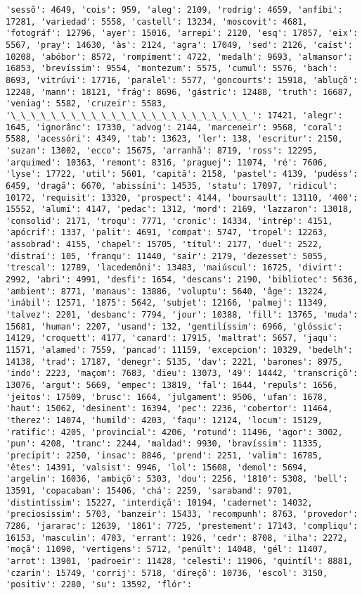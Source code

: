 \begin{Verbatim}[commandchars=\\\{\}]
'sessõ': 4649, 'cois': 959, 'aleg': 2109, 'rodrig': 4659, 'anfíbi': 17281, 'variedad': 5558, 'castell': 13234, 'moscovit': 4681, 'fotográf': 12796, 'ayer': 15016, 'arrepi': 2120, 'esq': 17857, 'eix': 5567, 'pray': 14630, 'às': 2124, 'agra': 17049, 'sed': 2126, 'caíst': 10208, 'abóbor': 8572, 'rompiment': 4722, 'medalh': 9693, 'almansor': 16853, 'brevíssim': 9554, 'montezum': 5575, 'cumul': 5576, 'bach': 8693, 'vitrúvi': 17716, 'paralel': 5577, 'goncourts': 15918, 'abluçõ': 12248, 'mann': 18121, 'frág': 8696, 'gástric': 12488, 'truth': 16687, 'veniag': 5582, 'cruzeir': 5583, '\_\_\_\_\_\_\_\_\_\_\_\_\_\_\_\_\_\_\_\_\_\_\_\_': 17421, 'alegr': 1645, 'ignorânc': 17330, 'advog': 2144, 'marceneir': 9568, 'coral': 5588, 'acessóri': 4349, 'tab': 13623, 'ler': 138, 'escritur': 2150, 'suzan': 13002, 'ecco': 15675, 'arranhã': 8719, 'ross': 12295, 'arquimed': 10363, 'remont': 8316, 'praguej': 11074, 'ré': 7606, 'lyse': 17722, 'util': 5601, 'capitã': 2158, 'pastel': 4139, 'pudéss': 6459, 'dragã': 6670, 'abissíni': 14535, 'statu': 17097, 'ridicul': 10172, 'requisit': 13320, 'prospect': 4144, 'boursault': 13110, '400': 15552, 'alumi': 4147, 'pedac': 1312, 'mord': 2169, 'lazzaron': 13018, 'consolid': 2171, 'troqu': 7771, 'cronic': 14334, 'intrép': 4151, 'apócrif': 1337, 'palit': 4691, 'compat': 5747, 'tropel': 12263, 'assobrad': 4155, 'chapel': 15705, 'títul': 2177, 'duel': 2522, 'distraí': 105, 'franqu': 11440, 'sair': 2179, 'dezesset': 5055, 'trescal': 12789, 'lacedemôni': 13483, 'maiúscul': 16725, 'divirt': 2992, 'abri': 4991, 'desfi': 1654, 'descans': 2190, 'bibliotec': 5636, 'ambient': 8771, 'manaus': 13886, 'voluptu': 5640, 'âge': 13224, 'inábil': 12571, '1875': 5642, 'subjet': 12166, 'palmej': 11349, 'talvez': 2201, 'desbanc': 7794, 'jour': 10388, 'fill': 13765, 'muda': 15681, 'human': 2207, 'usand': 132, 'gentilíssim': 6966, 'glóssic': 14129, 'croquett': 4177, 'canard': 17915, 'maltrat': 5657, 'jaqu': 11571, 'alamed': 7559, 'pancad': 11159, 'excepcion': 10329, 'bedelh': 14138, 'trad': 17187, 'denegr': 5135, 'dav': 2221, 'barones': 8975, 'indo': 2223, 'maçom': 7683, 'dieu': 13073, '49': 14442, 'transcriçõ': 13076, 'argut': 5669, 'empec': 13819, 'fal': 1644, 'repuls': 1656, 'jeitos': 17509, 'brusc': 1664, 'julgament': 9506, 'ufan': 1678, 'haut': 15062, 'desinent': 16394, 'pec': 2236, 'cobertor': 11464, 'therez': 14074, 'humild': 4203, 'faqu': 12124, 'locum': 15129, 'ratific': 4205, 'provincial': 4206, 'rotund': 11496, 'agor': 3002, 'pun': 4208, 'tranc': 2244, 'maldad': 9930, 'bravíssim': 11335, 'precipit': 2250, 'insac': 8846, 'prend': 2251, 'valim': 16785, 'êtes': 14391, 'valsist': 9946, 'lol': 15608, 'demol': 5694, 'argelin': 16036, 'ambiçõ': 5303, 'dou': 2256, '1810': 5308, 'bell': 13591, 'copacaban': 15406, 'chá': 2259, 'saraband': 9701, 'distintíssim': 15227, 'interdiçã': 10194, 'cadernet': 14032, 'preciosíssim': 5703, 'banzeir': 15433, 'recompunh': 8763, 'provedor': 7286, 'jararac': 12639, '1861': 7725, 'prestement': 17143, 'compliqu': 16153, 'masculin': 4703, 'errant': 1926, 'cedr': 8708, 'ilha': 2272, 'moçã': 11090, 'vertigens': 5712, 'penúlt': 14048, 'gél': 11407, 'arrot': 13901, 'padroeir': 11428, 'celesti': 11906, 'quintíl': 8881, 'czarin': 15749, 'corrij': 5718, 'direçõ': 10736, 'escol': 3150, 'positiv': 2280, 'su': 13592, 'flór': 
\end{Verbatim}
